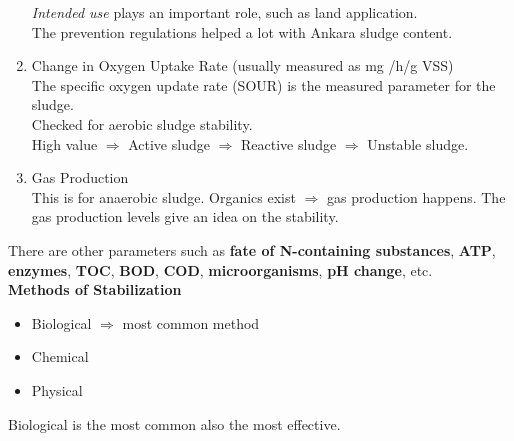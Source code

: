 \documentclass{article}
\numberwithin{equation}{section}
\begin{document}
\begin{enumerate}
    \emph{Intended use} plays an important role, such as land application.\\
    The prevention regulations helped a lot with Ankara sludge content.
    \item Change in Oxygen Uptake Rate (usually measured as mg /h/g VSS)\\
    The specific oxygen update rate (SOUR) is the measured parameter for the sludge.\\
    Checked for aerobic sludge stability.\\
    High value $\Rightarrow$ Active sludge $\Rightarrow$ Reactive sludge $\Rightarrow$ Unstable sludge.
    \item Gas Production\\
    This is for anaerobic sludge. Organics exist $\Rightarrow$ gas production happens. The gas production levels give an idea on the stability.
\end{enumerate}
There are other parameters such as \textbf{fate of N-containing substances}, \textbf{ATP}, \textbf{enzymes}, \textbf{TOC}, \textbf{BOD}, \textbf{COD}, \textbf{microorganisms}, \textbf{pH change}, etc.\\
\textbf{Methods of Stabilization}
\begin{itemize}
    \item Biological $\Rightarrow$ most common method
    \item Chemical
    \item Physical
\end{itemize}
Biological is the most common also the most effective.
\end{document}
